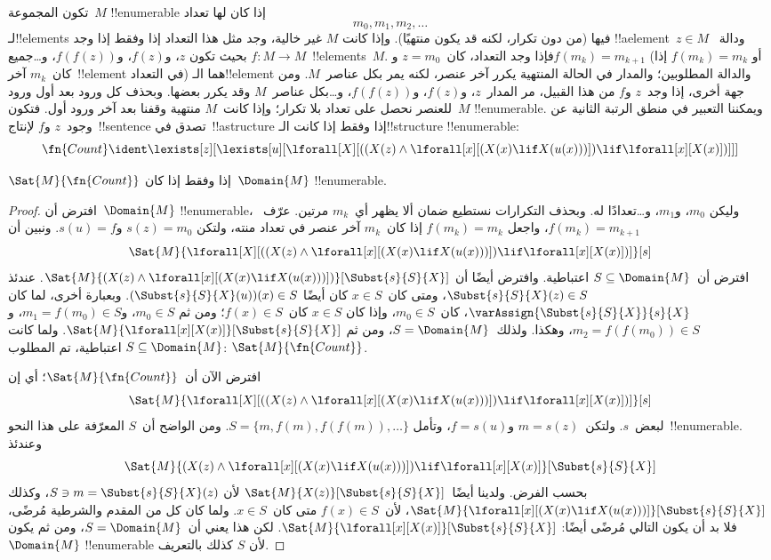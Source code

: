 \documentclass[../../../include/open-logic-section]{subfiles}
\begin{document}
تكون المجموعة~$M$ !!{enumerable} إذا كان لها تعداد
\[
m_0, m_1, m_2, \dots
\]
لـ!!{element}s فيها (من دون تكرار، لكنه قد يكون منتهيًا). وإذا كانت
$M$ غير خالية، وجد مثل هذا التعداد إذا وفقط إذا وجد
!!a{element}~$z \in M$ ودالة~$f\colon M \to M$ بحيث تكون
  $z$، و$f(z)$، و$f(f(z))$، و\dots جميع~!!{element}s~$M$. فإذا وجد
  التعداد، كان~$z = m_0$ و$f(m_k) = m_{k+1}$ (أو
  $f(m_k) = m_k$ إذا كان~$m_k$ آخر~!!{element} في التعداد) هما
  الـ!!{element} والدالة المطلوبين؛ والمدار في الحالة المنتهية يكرر
  آخر عنصر، لكنه يمر بكل عناصر~$M$. ومن جهة أخرى، إذا وجد~$z$ و$f$
  من هذا القبيل، مر المدار~$z$، و$f(z)$، و$f(f(z))$، و\dots بكل
  عناصر~$M$ وقد يكرر بعضها. وبحذف كل ورود بعد أول ورود للعنصر نحصل
  على تعداد بلا تكرار؛ وإذا كانت~$M$ منتهية وقفنا بعد آخر ورود أول.
  فتكون~$M$ !!{enumerable}. ويمكننا التعبير في منطق الرتبة الثانية عن
وجود~$z$ و$f$ لإنتاج~!!{sentence} تصدق في~!!a{structure} إذا وفقط
إذا كانت الـ!!{structure} !!{enumerable}:
\[
\fn{Count} \ident
\lexists[z][\lexists[u][\lforall[X][((X(z) \land
      \lforall[x][(X(x) \lif X(u(x)))]) \lif \lforall[x][X(x)])]]]
\]

\begin{prop}
$\Sat{M}{\fn{Count}}$ إذا وفقط إذا كان~$\Domain{M}$ !!{enumerable}.
\end{prop}

\begin{proof}
افترض أن~$\Domain{M}$ !!{enumerable}، وليكن
$m_0$، و$m_1$، و\dots تعدادًا له. وبحذف التكرارات نستطيع ضمان ألا
يظهر أي~$m_k$ مرتين. عرّف~$f(m_k) = m_{k+1}$، واجعل
$f(m_k)=m_k$ إذا كان~$m_k$ آخر عنصر في تعداد منته، ولتكن
$s(z) = m_0$ و$s(u) = f$. ونبين أن
\[
\Sat{M}{\lforall[X][((X(z) \land \lforall[x][(X(x) \lif X(u(x)))])
    \lif \lforall[x][X(x)])]}[s]
\]
افترض أن~$S \subseteq \Domain{M}$ اعتباطية. وافترض أيضًا أن
$\Sat{M}{(X(z) \land \lforall[x][(X(x) \lif
X(u(x)))])}[\Subst{s}{S}{X}]$. عندئذ
$\Subst{s}{S}{X}(z) \in S$، ومتى كان~$x \in S$ كان أيضًا
$(\Subst{s}{S}{X}(u))(x) \in S$. وبعبارة أخرى، لما كان
$\varAssign{\Subst{s}{S}{X}}{s}{X}$، كان~$m_0 \in S$، وإذا كان
$x \in S$ كان~$f(x) \in S$؛ ومن ثم
$m_0 \in S$، و$m_1 = f(m_0) \in S$، و
$m_2 = f(f(m_0)) \in S$، وهكذا. ولذلك~$S = \Domain{M}$، ومن ثم
$\Sat{M}{\lforall[x][X(x)]}[\Subst{s}{S}{X}]$. ولما كانت
$S \subseteq \Domain{M}$ اعتباطية، تم المطلوب:
$\Sat{M}{\fn{Count}}$.

افترض الآن أن~$\Sat{M}{\fn{Count}}$؛ أي إن
\[
\Sat{M}{\lforall[X][((X(z) \land \lforall[x][(X(x) \lif X(u(x)))])
    \lif \lforall[x][X(x)])]}[s]
\]
لبعض~$s$. ولتكن~$m = s(z)$ و$f = s(u)$، وتأمل
$S = \{m, f(m), f(f(m)), \dots\}$. ومن الواضح أن~$S$ المعرّفة على
هذا النحو~!!{enumerable}. وعندئذ
\[
\Sat{M}{(X(z) \land \lforall[x][(X(x) \lif X(u(x)))])
    \lif \lforall[x][X(x)]}[\Subst{s}{S}{X}]
\]
بحسب الفرض. ولدينا أيضًا~$\Sat{M}{X(z)}[\Subst{s}{S}{X}]$ لأن
$S \ni m = \Subst{s}{S}{X}(z)$، وكذلك
$\Sat{M}{\lforall[x][(X(x) \lif
X(u(x)))]}[\Subst{s}{S}{X}]$، لأن~$f(x) \in S$ متى كان~$x \in S$.
ولما كان كل من المقدم والشرطية مُرضًى، فلا بد أن يكون التالي مُرضًى
أيضًا: $\Sat{M}{\lforall[x][X(x)]}[\Subst{s}{S}{X}]$. لكن هذا يعني
أن~$S = \Domain{M}$، ومن ثم يكون~$\Domain{M}$ !!{enumerable} لأن
$S$ كذلك بالتعريف.
\end{proof}
\end{document}
